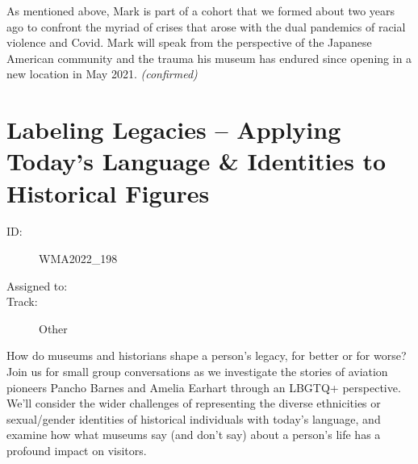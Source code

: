 \documentclass{report}
\begin{document}
                

                As mentioned above, Mark is part of a cohort that we formed about two years ago to confront the myriad of crises that arose with the dual pandemics of racial violence and Covid. Mark will speak from the perspective of the Japanese American community and the trauma his museum has endured since opening in a new location in May 2021.
                \emph{ (confirmed) }
              

              
        
          \newpage
          \section{ Labeling Legacies – Applying Today’s Language & Identities to Historical Figures  }
            \begin{description}
              \item [ID:]
              WMA2022\_198

              \item [Assigned to:]
                \item [Track:]Other~
              \end{description}

              How do museums and historians shape a person’s legacy, for better or for worse? Join us for small group conversations as we investigate the stories of aviation pioneers Pancho Barnes and Amelia Earhart through an LBGTQ+ perspective. We’ll consider the wider challenges of representing the diverse ethnicities or sexual/gender identities of historical individuals with today’s language, and examine how what museums say (and don’t say) about a person’s life has a profound impact on visitors.
\end{document}
